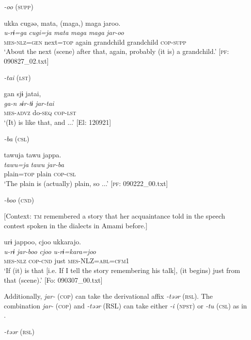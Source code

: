 \ex \textit{-oo} (\textsc{supp})

{\TM}
\glll  ukka  cugəə,  mata,  (maga,)  maga  jaroo.\\
\textit{u-rɨ=ga}  \textit{cugi=ja}  \textit{mata}  \textit{maga}  \textit{maga}  \textit{jar-oo}\\
\textsc{mes}-\textsc{nlz}=\textsc{gen}  next=\textsc{top}  again  grandchild  grandchild  \textsc{cop}-\textsc{supp}\\
\glt ‘About the next (scene) after that, again, probably (it is) a grandchild.’ [\textsc{pf}: 090827\_02.txt]

\ex \textit{-tai} (\textsc{lst})

{\TM}
\glll  gan  sjɨ  jatai,\\
\textit{ga-n}  \textit{sɨr-tɨ}  \textit{jar-tai}\\
\textsc{mes}-\textsc{advz}  do-\textsc{seq}  \textsc{cop}-\textsc{lst}\\
\glt ‘(It) is like that, and ...’ [El: 120921]


\ex \textit{-ba} (\textsc{csl})

{\TM}
\glll  tawuja  tawu  jappa.\\
\textit{tawu=ja}  \textit{tawu}  \textit{jar-ba}\\
plain=\textsc{top}  plain  \textsc{cop}-\textsc{csl}\\
\glt ‘The plain is (actually) plain, so ...’ [\textsc{pf}: 090222\_00.txt]

\ex \textit{-boo} (\textsc{cnd})

    [Context: \textsc{tm} remembered a story that her acquaintance told in the speech contest spoken in the dialects in Amami before.]

{\TM}
\glll  urɨ  jappoo,  cjoo  ukkarajo.\\
\textit{u-rɨ}  \textit{jar-boo}  \textit{cjoo}  \textit{u-rɨ=kara=joo}\\
\textsc{mes}-\textsc{nlz}  \textsc{cop}-\textsc{cnd}  just  \textsc{mes}-NLZ=\textsc{abl}=\textsc{cfm1}\\
\glt ‘If (it) is that [i.e. If I tell the story remembering his talk], (it begins) just from that (scene).’ [Fo: 090307\_00.txt]
\z
\z

Additionally, \textit{jar-} (\textsc{cop}) can take the derivational affix \textit{-təər} (\textsc{rsl}). The combination \textit{jar-} (\textsc{cop}) and \textit{-təər} (RSL) can take either \textit{-i} (\textsc{npst}) or \textit{-tu} (\textsc{csl}) as in .

\ea\label{ex:8-37}
  \textit{-təər} (\textsc{rsl})


